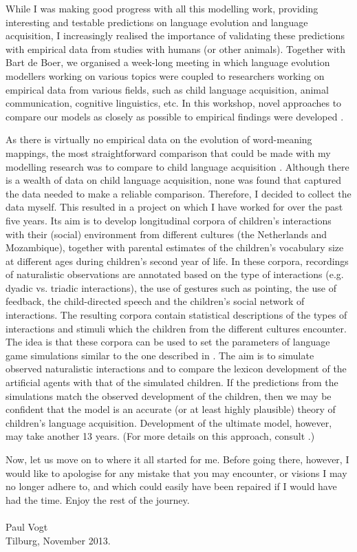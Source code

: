 While I was making good progress with all this modelling work, providing interesting and testable predictions on language evolution and language acquisition, I increasingly realised the importance of validating these predictions with empirical data from studies with humans (or other animals). Together with Bart de Boer, we organised a week-long meeting in which language evolution modellers working on various topics were coupled to researchers working on empirical data from various fields, such as child language acquisition, animal communication, cognitive linguistics, etc. In this workshop, novel approaches to compare our models as closely as possible to empirical findings were developed \citep{vogtdeboer:2010}.

As there is virtually no empirical data on the evolution of word-meaning mappings, the most straightforward comparison that could be made with my modelling research was to compare to child language acquisition \citep{vogtlieven:2010}. Although there is a wealth of data on child language acquisition, none was found that captured the data needed to make a reliable comparison. Therefore, I decided to collect the data myself. This resulted in a project on which I have worked for over the past five years. Its aim is to develop longitudinal corpora of children's interactions with their (social) environment from different cultures (the Netherlands and Mozambique), together with parental estimates of the children's vocabulary size at different ages during children's second year of life. In these corpora, recordings of naturalistic observations are annotated based on the type of interactions (e.g. dyadic vs. triadic interactions), the use of gestures such as pointing, the use of feedback, the child-directed speech and the children's social network of interactions. The resulting corpora  contain statistical descriptions of the types of interactions and stimuli which the children from the different cultures encounter. The idea is that these corpora can be used to set the parameters of language game simulations similar to the one described in \citet{vogthaasdijk:2010}. The aim is to simulate observed naturalistic interactions and to compare the lexicon development of the artificial agents with that of the simulated children. If the predictions from the simulations match the observed development of the children, then we may be confident that the model is an accurate (or at least highly plausible) theory of children's language acquisition. Development of the ultimate model, however, may take another 13 years. (For more details on this approach, consult \citealt{vogtmastin:2013}.)

 
Now, let us move on to where it all started for me. Before going there, however, I would like to apologise for any mistake that you may encounter, or visions I may no longer adhere to, and which could easily have been repaired if I would have had the time. Enjoy the rest of the journey.\\
\\
\noindent Paul Vogt\\
\noindent Tilburg, November 2013.
